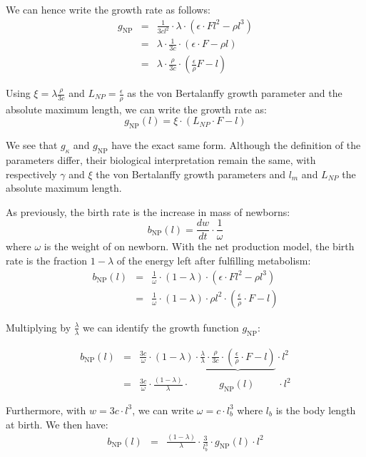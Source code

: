 We can hence write the growth rate as follows:
\begin{eqnarray*}
g_{\text{NP}} & = & \frac{1}{3cl^{2}}\cdot\lambda\cdot\left(\epsilon\cdot Fl^{2}-\rho l^{3}\right)\\
 & = & \lambda\cdot\frac{1}{3c}\cdot\left(\epsilon\cdot F-\rho l\right)\\
 & = & \lambda\cdot\frac{\rho}{3c}\cdot\left(\frac{\epsilon}{\rho}F-l\right)
\end{eqnarray*}


Using ${\displaystyle \xi=\lambda\frac{\rho}{3c}}$ and ${\displaystyle L_{NP}=\frac{\epsilon}{\rho}}$
as the von Bertalanffy growth parameter and the absolute maximum length,
we can write the growth rate as:
\[
g_{\text{NP}}(l)=\xi\cdot\left(L_{NP}\cdot F-l\right)
\]


We see that $g_{\kappa}$ and $g_{\text{NP}}$ have the exact same
form. Although the definition of the parameters differ, their biological
interpretation remain the same, with respectively $\gamma$ and $\xi$
the von Bertalanffy growth parameters and $l_m$ and $L_{NP}$ the
absolute maximum length. 

As previously, the birth rate is the increase in mass of newborns:
\[
b_{\text{NP}}(l)=\frac{dw}{dt}\cdot\frac{1}{\omega}
\]
where $\omega$ is the weight of on newborn. With the net production
model, the birth rate is the fraction $1-\lambda$ of the energy left
after fulfilling metabolism:
\begin{eqnarray*}
b_{\text{NP}}(l) & = & \frac{1}{\omega}\cdot(1-\lambda)\cdot\left(\epsilon\cdot Fl^{2}-\rho l^{3}\right)\\
 & = & \frac{1}{\omega}\cdot(1-\lambda)\cdot\rho l^{2}\cdot\left(\frac{\epsilon}{\rho}\cdot F-l\right)
\end{eqnarray*}


Multiplying by $\frac{\lambda}{\lambda}$ we can identify the growth
function $g_{\text{NP}}$:

\begin{eqnarray*}
b_{\text{NP}}(l) & = & \frac{3c}{\omega}\cdot(1-\lambda)\cdot\underbrace{\frac{\lambda}{\lambda}\cdot\frac{\rho}{3c}\cdot\left(\frac{\epsilon}{\rho}\cdot F-l\right)}\cdot l^{2}\\
 & = & \frac{3c}{\omega}\cdot\frac{(1-\lambda)}{\lambda}\cdot\qquad\quad g_{\text{NP}}(l)\;\qquad\cdot l^{2}
\end{eqnarray*}


Furthermore, with $w=3c\cdot l^{3}$, we can write $\omega=c\cdot l_b^{3}$
where $l_b$ is the body length at birth. We then have:
\begin{eqnarray*}
b_{\text{NP}}(l) & = & \frac{(1-\lambda)}{\lambda}\cdot\frac{3}{l_b^{3}}\cdot g_{\text{NP}}(l)\cdot l^{2}
\end{eqnarray*}


